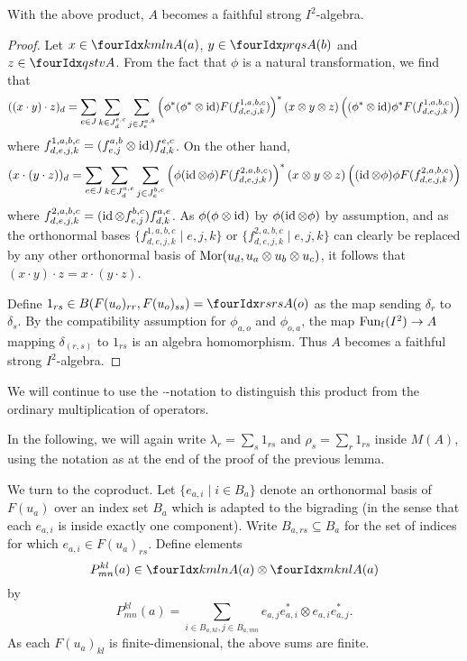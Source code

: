 \begin{Lem} With the above product, $A$ becomes a faithful strong $I^2$-algebra.
\end{Lem}

\begin{proof} Let $x\in \Gr{A}{k}{l}{m}{n}(a)$, $y\in \Gr{A}{p}{q}{r}{s}(b)$ and $z\in \Gr{A}{q}{t}{s}{v}$. From the fact that $\phi$ is a natural transformation, we find that \[((x\cdot y)\cdot z)_d = \sum_{e\in J}\sum_{k\in J_d^{e,c}}\sum_{j\in J_e^{a,b}} \left(\phi^*(\phi^*\otimes \operatorname{id})F(f_{d,e,j,k}^{1,a,b,c})\right)^*(x\otimes y\otimes z)\left((\phi^*\otimes \operatorname{id})\phi^* F(f_{d,e,j,k}^{1,a,b,c})\right)\] where $f_{d,e,j,k}^{1,a,b,c}=(f_{e,j}^{a,b}\otimes \operatorname{id})f_{d,k}^{e,c}$. On the other hand, \[(x\cdot (y\cdot z))_d = \sum_{e\in J}\sum_{k\in J_d^{a,e}}\sum_{j\in J_e^{b,c}} \left(\phi(\operatorname{id}\otimes \phi)F(f_{d,e,j,k}^{2,a,b,c})\right)^*(x\otimes y\otimes z)\left((\operatorname{id}\otimes \phi)\phi F(f_{d,e,j,k}^{2,a,b,c})\right)\] where $f_{d,e,j,k}^{2,a,b,c} = (\operatorname{id}\otimes f_{e,j}^{b,c})f_{d,k}^{a,e}$. As $\phi(\phi\otimes \operatorname{id})$ by $\phi(\operatorname{id}\otimes \phi)$ by assumption, and as the orthonormal bases $\{f_{d,e,j,k}^{1,a,b,c}\mid e,j,k\}$ or $\{f^{2,a,b,c}_{d,e,j,k}\mid e,j,k\}$ can clearly be replaced by any other orthonormal basis of $\mathrm{Mor}(u_d,u_a\otimes u_b\otimes u_c)$, it follows that $(x\cdot y)\cdot z = x\cdot (y\cdot z)$.

Define $1_{rs} \in B(F(u_o)_{rr},F(u_o)_{ss}) = \Gr{A}{r}{r}{s}{s}(o)$ as the map sending $\delta_r$ to $\delta_s$. By the compatibility assumption for $\phi_{a,o}$ and $\phi_{o,a}$, the map $\mathrm{Fun}_{\operatorname{\mathrm{f}}}(I^2)\rightarrow A$ mapping $\delta_{(r,s)}$ to $1_{rs}$ is an algebra homomorphism. Thus $A$ becomes a faithful strong $I^2$-algebra.
\end{proof}

We will continue to use the $\cdot$-notation to distinguish this product from the ordinary multiplication of operators.

In the following, we will again write $\lambda_r = \sum_s 1_{rs}$ and $\rho_s = \sum_r 1_{rs}$ inside $M(A)$, using the notation as at the end of the proof of the previous lemma.

We turn to the coproduct. Let $\{e_{a,i}\mid i\in B_a\}$ denote an orthonormal basis of $F(u_a)$ over an index set $B_a$ which is adapted to the bigrading (in the sense that each $e_{a,i}$ is inside exactly one component). Write $B_{a,rs}\subseteq B_a$ for the set of indices for which $e_{a,i}\in F(u_a)_{rs}$. Define elements \[P^{kl}_{mn}(a)\in \Gr{A}{k}{l}{m}{n}(a) \otimes \Gr{A}{m}{n}{k}{l}(a)\] by \[P^{kl}_{mn}(a) = \sum_{i\in B_{a,kl},j\in B_{a,mn}}  e_{a,j}e_{a,i}^*\otimes e_{a,i}e_{a,j}^*.\] As each $F(u_a)_{kl}$ is finite-dimensional, the above sums are finite.


